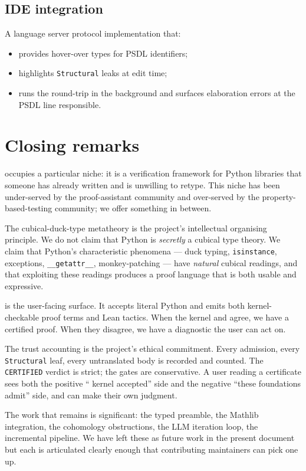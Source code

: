 \subsection{IDE integration}

A language server protocol implementation that:
\begin{itemize}[leftmargin=1.7em]
  \item provides hover-over types for PSDL identifiers;
  \item highlights \texttt{Structural} leaks at edit time;
  \item runs the \Lean{} round-trip in the background and surfaces
    elaboration errors at the PSDL line responsible.
\end{itemize}

\section{Closing remarks}

\Deppy{} occupies a particular niche: it is a verification
framework for Python libraries that someone has already written
and is unwilling to retype.  This niche has been under-served by
the proof-assistant community and over-served by the
property-based-testing community; we offer something in between.

The cubical-duck-type metatheory is the project's intellectual
organising principle.  We do not claim that Python is
\emph{secretly} a cubical type theory.  We claim that Python's
characteristic phenomena --- duck typing, \texttt{isinstance},
exceptions, \texttt{\_\_getattr\_\_}, monkey-patching --- have
\emph{natural} cubical readings, and that exploiting these
readings produces a proof language that is both usable and
expressive.

\PSDL{} is the user-facing surface.  It accepts literal Python and
emits both kernel-checkable proof terms and Lean tactics.  When
the kernel and \Lean{} agree, we have a certified proof.  When
they disagree, we have a diagnostic the user can act on.

The trust accounting is the project's ethical commitment.  Every
admission, every \texttt{Structural} leaf, every untranslated
body is recorded and counted.  The \texttt{CERTIFIED} verdict is
strict; the gates are conservative.  A user reading a \Deppy{}
certificate sees both the positive ``\Lean{} kernel accepted''
side and the negative ``these foundations admit'' side, and can
make their own judgment.

The work that remains is significant: the typed preamble, the
Mathlib integration, the cohomology obstructions, the LLM
iteration loop, the incremental pipeline.  We have left these as
future work in the present document but each is articulated
clearly enough that contributing maintainers can pick one up.

